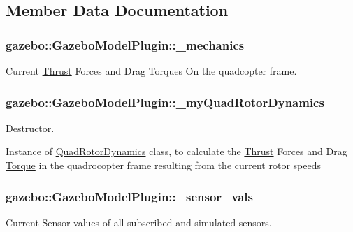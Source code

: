 \subsection{\-Member \-Data \-Documentation}
\hypertarget{classgazebo_1_1GazeboModelPlugin_a02f22e2315b742e4b76807364082d8ec}{
\subsubsection[{\-\_\-mechanics}]{ {\bf gazebo\-::\-Gazebo\-Model\-Plugin\-::\-\_\-mechanics}}}\label{classgazebo_1_1GazeboModelPlugin_a02f22e2315b742e4b76807364082d8ec}
\-Current \hyperlink{classThrust}{\-Thrust} \-Forces and \-Drag \-Torques \-On the quadcopter frame. \hypertarget{classgazebo_1_1GazeboModelPlugin_aa7c7b05e8f795ed76e5042a62fc829c4}{
\subsubsection[{\-\_\-my\-Quad\-Rotor\-Dynamics}]{ {\bf gazebo\-::\-Gazebo\-Model\-Plugin\-::\-\_\-my\-Quad\-Rotor\-Dynamics}}}\label{classgazebo_1_1GazeboModelPlugin_aa7c7b05e8f795ed76e5042a62fc829c4}


\-Destructor. 

\-Instance of \hyperlink{classQuadRotorDynamics}{\-Quad\-Rotor\-Dynamics} class, to calculate the \hyperlink{classThrust}{\-Thrust} \-Forces and \-Drag \hyperlink{classTorque}{\-Torque} in the quadrocopter frame resulting from the current rotor speeds \hypertarget{classgazebo_1_1GazeboModelPlugin_a1e9a41b9fd8c68ac969d97f933db0198}{
\subsubsection[{\-\_\-sensor\-\_\-vals}]{ {\bf gazebo\-::\-Gazebo\-Model\-Plugin\-::\-\_\-sensor\-\_\-vals}}}\label{classgazebo_1_1GazeboModelPlugin_a1e9a41b9fd8c68ac969d97f933db0198}
\-Current \-Sensor values of all subscribed and simulated sensors. 

